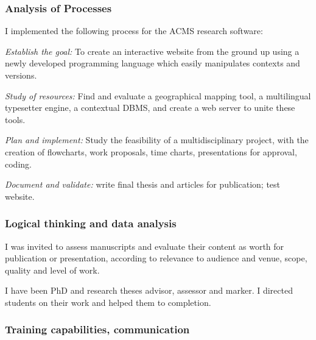\begin{minipage}{0.50\textwidth}

\subsubsection*{Analysis of Processes}
\vspace*{-0.2cm}

I implemented the following process
for the ACMS research software:

\vspace*{.1cm}
{\it Establish the goal:} To create an interactive website from the ground up
using a newly developed programming language which easily manipulates
contexts and versions. 
\vspace*{.1cm}

{\it Study of resources:} Find and evaluate
a geographical mapping tool,
a multilingual typesetter engine,
a contextual DBMS,
and
create a web server
to unite these tools.
\vspace*{.1cm}

{\it Plan and implement:} Study the feasibility of a
multidisciplinary project, with the creation of
flowcharts, work proposals,
time charts, 
presentations for approval,
coding.%
\vspace*{.1cm}

{\it Document and validate:} write final thesis and articles for
publication; test website.

\subsubsection*{Logical thinking and data analysis}
\vspace*{-0.2cm}


I was invited to assess manuscripts and
evaluate their content as worth for publication or presentation, according
to relevance to audience and venue, scope, quality and level of work. 

\vspace*{.1cm}

I have been PhD and research theses advisor, assessor and marker.
I directed students on their work and helped them to completion.




\subsubsection*{Training capabilities, communication}
\vspace*{-0.2cm}


\end{minipage}
